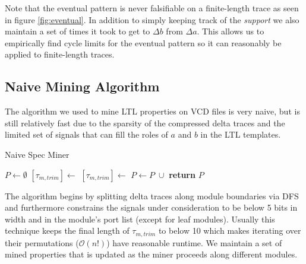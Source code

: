 \documentclass[acmlarge,11pt,nonacm]{acmart}
\begin{document}
Note that the eventual pattern is never falsifiable on a finite-length trace as seen in figure \ref{fig:eventual}.
In addition to simply keeping track of the \textit{support} we also maintain a set of times it took to get to $\Delta b$ from $\Delta a$.
This allows us to empirically find cycle limits for the eventual pattern so it can reasonably be applied to finite-length traces.

\subsection{Naive Mining Algorithm}
The algorithm we used to mine LTL properties on VCD files is very naive, but is still relatively fast due to the sparsity of the compressed delta traces and the limited set of signals that can fill the roles of $a$ and $b$ in the LTL templates.
\begin{algorithm}[H]
  \caption{Naive Spec Miner}
  \begin{algorithmic}[1]
     
      \State $P \gets \emptyset$
       
        \State $[\tau_{m,trim}] \gets$  
         
          \State $[\tau_{m,trim}] \gets$ 
        \EndIf
            \State $P \gets P \; \cup$ 
          \EndFor
        \EndFor
      \EndFor
      \State \textbf{return} $P$
    \EndProcedure
  \end{algorithmic}
\end{algorithm}

The algorithm begins by splitting delta traces along module boundaries via DFS and furthermore constrains the signals under consideration to be below 5 bits in width and in the module's port list (except for leaf modules).
Usually this technique keeps the final length of $\tau_{m,trim}$ to below 10 which makes iterating over their permutations ($\mathcal{O}(n!)$) have reasonable runtime.
We maintain a set of mined properties that is updated as the miner proceeds along different modules.
\end{document}
